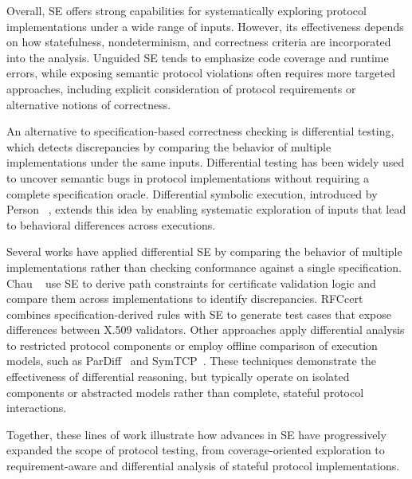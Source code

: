 Overall, SE offers strong capabilities for systematically exploring protocol implementations under a wide range of inputs.
However, its effectiveness depends on how statefulness, nondeterminism, and correctness criteria are incorporated into the analysis.
Unguided SE tends to emphasize code coverage and runtime errors, while exposing semantic protocol violations often requires more targeted approaches, including explicit consideration of protocol requirements or alternative notions of correctness.

An alternative to specification-based correctness checking is differential testing, which detects discrepancies by comparing the behavior of multiple implementations under the same inputs.
Differential testing has been widely used to uncover semantic bugs in protocol implementations without requiring a complete specification oracle.
Differential symbolic execution, introduced by Person \etal~\cite{DSE@08}, extends this idea by enabling systematic exploration of inputs that lead to behavioral differences across executions.

Several works have applied differential SE by comparing the behavior of multiple implementations rather than checking conformance against a single specification.
Chau \etal~\cite{SymCerts,PKCS} use SE to derive path constraints for certificate validation logic and compare them across implementations to identify discrepancies.
RFCcert~\cite{RFCcert@ICSE-18} combines specification-derived rules with SE to generate test cases that expose differences between X.509 validators.
Other approaches apply differential analysis to restricted protocol components or employ offline comparison of execution models, such as ParDiff~\cite{ParDiff@24} and SymTCP~\cite{SymTCP@NDSS-20}.
These techniques demonstrate the effectiveness of differential reasoning, but typically operate on isolated components or abstracted models rather than complete, stateful protocol interactions.

Together, these lines of work illustrate how advances in SE have progressively expanded the scope of protocol testing, from coverage-oriented exploration to requirement-aware and differential analysis of stateful protocol implementations.

